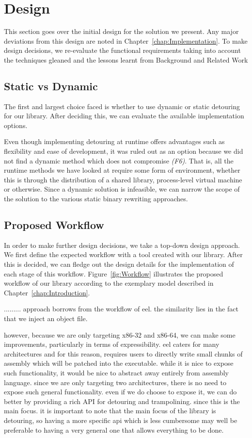 \chapter{Design}\label{chap:Design}

This section goes over the initial design for the solution we present. Any major deviations from this design are noted in Chapter~\ref{chap:Implementation}. To make design decisions, we re-evaluate the functional requirements taking into account the techniques gleaned and the lessons learnt from Background and Related Work

\section{Static vs Dynamic}

The first and largest choice faced is whether to use dynamic or static detouring for our library. After deciding this, we can evaluate the available implementation options.

Even though implementing detouring at runtime offers advantages such as flexibility and ease of development, it was ruled out as an option because we did not find a dynamic method which does not compromise \emph{(F6)}. That is, all the runtime methods we have looked at require some form of environment, whether this is through the distribution of a shared library, process-level virtual machine or otherwise. Since a dynamic solution is infeasible, we can narrow the scope of the solution to the various static binary rewriting approaches.

\section{Proposed Workflow}

In order to make further design decisions, we take a top-down design approach. We first define the expected workflow with a tool created with our library. After this is decided, we can fledge out the design details for the implementation of each stage of this workflow. Figure~\ref{fig:Workflow} illustrates the proposed workflow of our library according to the exemplary model described in Chapter~\ref{chap:Introduction}.

.........
approach borrows from the workflow of eel. the similarity lies in the fact that we inject an object file.

however, because we are only targeting x86-32 and x86-64, we can make some improvements, particularly in terms of expressibility. eel caters for many architectures and for this reason, requires users to directly write small chunks of assembly which will be patched into the executable. while it is nice to expose such functionality, it would be nice to abstract away entirely from assembly language. since we are only targeting two architectures, there is no need to expose such general functionality. even if we do choose to expose it, we can do better by providing a rich API for detouring and trampolining. since this is the main focus. it is important to note that the main focus of the library is detouring, so having a more specific api which is less cumbersome may well be preferable to having a very general one that allows everything to be done.

